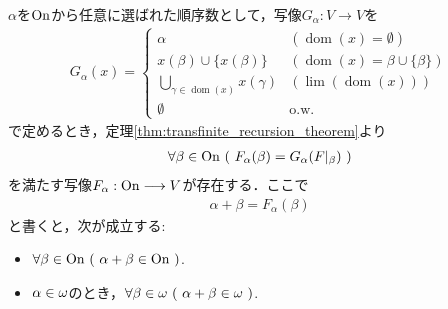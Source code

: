 	\begin{screen}
		\begin{thm}[順序数の加法]\label{thm:the_definition_of_addition_of_ordinal_numbers}
			$\alpha$を$\mathrm{On}$から任意に選ばれた順序数として，写像$G_\alpha:V \longrightarrow V$を
			\begin{align}
				G_\alpha(x) = 
				\begin{cases}
					\alpha & (\operatorname{dom}(x) = \emptyset) \\
					x(\beta) \cup \{x(\beta)\} & (\operatorname{dom}(x) = \beta \cup \{\beta\}) \\
					\bigcup_{\gamma \in \operatorname{dom}(x)} x(\gamma) & 
					(\operatorname{lim}(\operatorname{dom}(x))) \\
					\emptyset & \mathrm{o.w.}
				\end{cases}
			\end{align}
			で定めるとき，定理\ref{thm:transfinite_recursion_theorem}より
			\begin{align}
				\forall \beta \in \mathrm{On}\ (\ F_\alpha(\beta) = G_\alpha(F|_\beta)\ )
			\end{align}
			を満たす写像$F_\alpha:\mathrm{On} \longrightarrow V$が存在する．ここで
			\begin{align}
				\alpha + \beta = F_\alpha (\beta)
			\end{align}
			と書くと，次が成立する:
			\begin{itemize}
				\item $\forall \beta \in \mathrm{On}\ (\ \alpha + \beta \in \mathrm{On}\ )$.
				\item $\alpha \in {\bf \omega}$のとき，$\forall \beta \in {\bf \omega}\ 
				(\ \alpha + \beta \in {\bf \omega}\ )$.
			\end{itemize}
		\end{thm}
	\end{screen}
	
